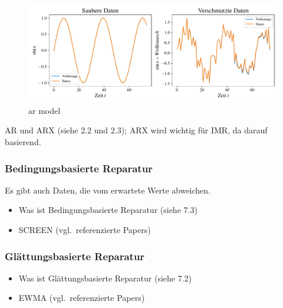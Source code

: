 \begin{itemize}
\begin{figure}[h]
      \includegraphics[width=\textwidth,keepaspectratio]{../plots/arx_sauber_verschmutze_daten.pdf}
      \caption{ar model}
    \end{figure}
  AR und ARX (siehe 2.2 und 2.3); ARX wird wichtig für IMR, da darauf basierend.
\end{itemize}
\subsubsection{Bedingungsbasierte Reparatur}
Es gibt auch Daten, die vom erwartete Werte abweichen. 
\begin{itemize}
  \item Was ist Bedingungsbasierte Reparatur (siehe 7.3)
  \item SCREEN (vgl.\ referenzierte Papers) 
\end{itemize}
\subsubsection{Glättungsbasierte Reparatur}
\begin{itemize}
  \item Was ist Glättungsbasierte Reparatur (siehe 7.2)
  \item EWMA (vgl.\ referenzierte Papers) 
\end{itemize}

